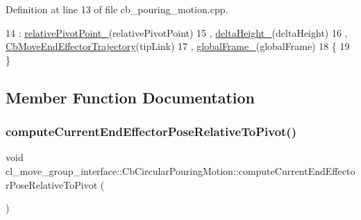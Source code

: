Definition at line 13 of file cb\+\_\+pouring\+\_\+motion.\+cpp.


\begin{DoxyCode}
14         : \hyperlink{classcl__move__group__interface_1_1CbCircularPouringMotion_a686d15e252dc8e503985e97014690cc6}{relativePivotPoint\_}(relativePivotPoint)
15         , \hyperlink{classcl__move__group__interface_1_1CbCircularPouringMotion_a7009d617bcd8ac1fba49100444434f3c}{deltaHeight\_}(deltaHeight)
16         , \hyperlink{classcl__move__group__interface_1_1CbMoveEndEffectorTrajectory_af7e718b0c53e912fd74968abbb0a4810}{CbMoveEndEffectorTrajectory}(tipLink)
17         , \hyperlink{classcl__move__group__interface_1_1CbCircularPouringMotion_a1d54253dc370bce8dd413e08b4bf8c43}{globalFrame\_}(globalFrame)
18     \{
19     \}
\end{DoxyCode}


\subsection{Member Function Documentation}
\mbox{\label{classcl__move__group__interface_1_1CbCircularPouringMotion_a4986b396e0ba318a0046feea3f6eede6}} 
\subsubsection{\texorpdfstring{compute\+Current\+End\+Effector\+Pose\+Relative\+To\+Pivot()}{computeCurrentEndEffectorPoseRelativeToPivot()}}
{\footnotesize\ttfamily void cl\+\_\+move\+\_\+group\+\_\+interface\+::\+Cb\+Circular\+Pouring\+Motion\+::compute\+Current\+End\+Effector\+Pose\+Relative\+To\+Pivot (\begin{DoxyParamCaption}{ }\end{DoxyParamCaption})\hspace{0.3cm}{\ttfamily [private]}}

\mbox{\label{classcl__move__group__interface_1_1CbCircularPouringMotion_a26d603b1d9bdbf5b71da6c1c4af2c322}} 
